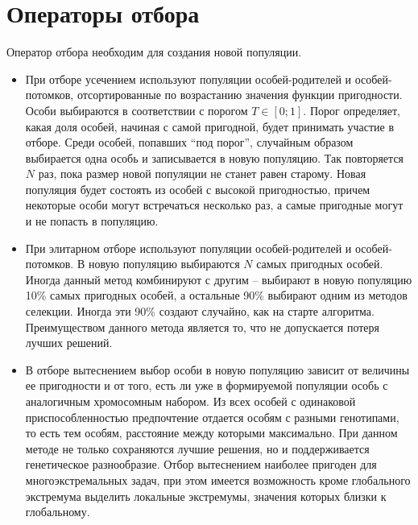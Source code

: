 \section{Операторы отбора}
Оператор отбора необходим для создания новой популяции.
\begin{itemize}[label=$\ast$]
	\item {}

При отборе усечением используют популяции особей-родителей и особей-потомков, отсортированные по возрастанию значения функции пригодности. Особи выбираются в соответствии с порогом $T \in [0;1]$. Порог определяет, какая доля особей, начиная с самой пригодной, будет принимать участие в отборе. Среди особей, попавших ``под порог'', случайным образом выбирается одна особь и записывается в новую популяцию. Так повторяется $N$ раз, пока размер новой популяции не станет равен старому. Новая популяция будет состоять из особей с высокой пригодностью, причем некоторые особи могут встречаться несколько раз, а самые пригодные могут и не попасть в популяцию.
	\item {}

При элитарном отборе используют популяции особей-родителей и особей-потомков. В новую популяцию выбираются $N$ самых пригодных особей. Иногда данный метод комбинируют с другим -- выбирают в новую популяцию 10\% самых пригодных особей, а остальные 90\% выбирают одним из методов селекции. Иногда эти 90\% создают случайно, как на старте алгоритма. Преимуществом данного метода является то, что не допускается потеря лучших решений.
	\item {}

В отборе вытеснением выбор особи в новую популяцию зависит от величины ее пригодности и от того, есть ли уже в формируемой популяции особь с аналогичным хромосомным набором. Из всех особей с одинаковой приспособленностью предпочтение отдается особям с разными генотипами, то есть тем особям, расстояние между которыми максимально. При данном методе не только сохраняются лучшие решения, но и поддерживается генетическое разнообразие. Отбор вытеснением наиболее пригоден для многоэкстремальных задач, при этом имеется возможность кроме глобального экстремума выделить локальные экстремумы, значения которых близки к глобальному.
\end{itemize}

